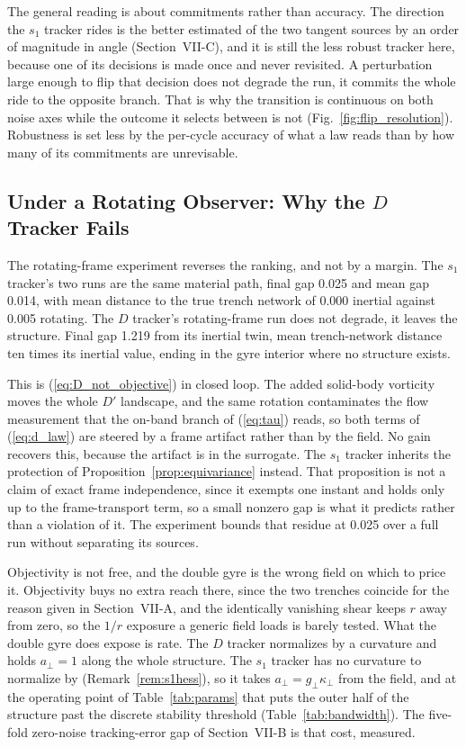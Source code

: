 \documentclass[lettersize,journal]{IEEEtran}
\begin{document}
The general reading is about commitments rather than accuracy. The
direction the $s_1$ tracker rides is the better estimated of the two
tangent sources by an order of magnitude in angle
(Section~\mbox{VII-C}), and it is still the less robust tracker here,
because one of its decisions is made once and never revisited. A
perturbation large enough to flip that decision does not degrade the
run, it commits the whole ride to the opposite branch. That is why the
transition is continuous on both noise axes while the outcome it
selects between is not (Fig.~\ref{fig:flip_resolution}). Robustness is
set less by the per-cycle accuracy of what a law reads than by how many
of its commitments are unrevisable.

\subsection{Under a Rotating Observer: Why the $D$ Tracker Fails}
\label{sec:objectivity_tradeoff}

The rotating-frame experiment reverses the ranking, and not by a
margin. The $s_1$ tracker's two runs are the same material path, final
gap 0.025 and mean gap 0.014, with mean distance to the true trench
network of 0.000 inertial against 0.005 rotating. The $D$ tracker's
rotating-frame run does not degrade, it leaves the structure. Final gap
1.219 from its inertial twin, mean trench-network distance ten times
its inertial value, ending in the gyre interior where no structure
exists.

This is (\ref{eq:D_not_objective}) in closed loop. The added solid-body
vorticity moves the whole $D'$ landscape, and the same rotation
contaminates the flow measurement that the on-band branch of
(\ref{eq:tau}) reads, so both terms of (\ref{eq:d_law}) are steered by
a frame artifact rather than by the field. No gain recovers this,
because the artifact is in the surrogate. The $s_1$ tracker inherits
the protection of Proposition~\ref{prop:equivariance} instead. That
proposition is not a claim of exact frame independence, since it
exempts one instant and holds only up to the frame-transport term, so a
small nonzero gap is what it predicts rather than a violation of it.
The experiment bounds that residue at 0.025 over a full run without
separating its sources.

Objectivity is not free, and the double gyre is the wrong field on
which to price it. Objectivity buys no extra reach there, since the two
trenches coincide for the reason given in Section~\mbox{VII-A}, and the
identically vanishing shear keeps $r$ away from zero, so the $1/r$
exposure a generic field loads is barely tested. What the double gyre
does expose is rate. The $D$ tracker normalizes by a curvature and
holds $a_\perp = 1$ along the whole structure. The $s_1$ tracker has no
curvature to normalize by (Remark~\ref{rem:s1hess}), so it takes
$a_\perp = g_\perp\kappa_\perp$ from the field, and at the operating
point of Table~\ref{tab:params} that puts the outer half of the
structure past the discrete stability threshold
(Table~\ref{tab:bandwidth}). The five-fold zero-noise tracking-error
gap of Section~\mbox{VII-B} is that cost, measured.
\end{document}
